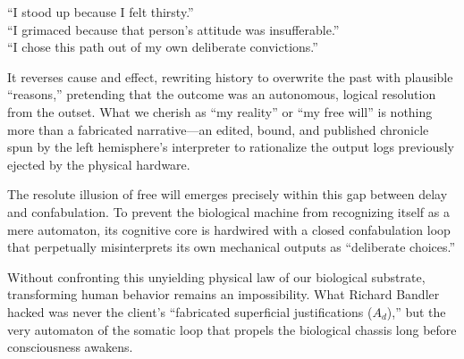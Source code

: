     ``I stood up because I felt thirsty.''\\
    ``I grimaced because that person's attitude was insufferable.''\\
    ``I chose this path out of my own deliberate convictions.''

    It reverses cause and effect, rewriting history to overwrite the past with plausible ``reasons,'' pretending that the outcome was an autonomous, logical resolution from the outset.
    What we cherish as ``my reality'' or ``my free will'' is nothing more than a fabricated narrative—an edited, bound, and published chronicle spun by the left hemisphere's interpreter to rationalize the output logs previously ejected by the physical hardware.

    The resolute illusion of free will emerges precisely within this gap between delay and confabulation.
    To prevent the biological machine from recognizing itself as a mere automaton, its cognitive core is hardwired with a closed confabulation loop that perpetually misinterprets its own mechanical outputs as ``deliberate choices.''

    Without confronting this unyielding physical law of our biological substrate, transforming human behavior remains an impossibility.
    What Richard Bandler hacked was never the client's ``fabricated superficial justifications ($A_d$),'' but the very automaton of the somatic loop that propels the biological chassis long before consciousness awakens.
\fi
